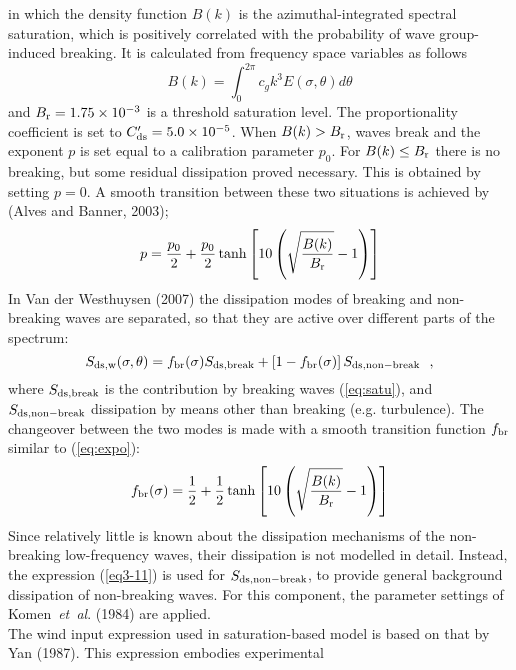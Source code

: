 \documentclass[12pt]{book}
\begin{document}
in which the density function $B(k)$ is the azimuthal-integrated spectral saturation, which is positively correlated with
the probability of wave group-induced breaking. It is calculated from frequency space variables as follows
\begin{equation}
  B(k) = \int_{0}^{2\pi} c_g k^3 E(\sigma,\theta) d\theta
\end{equation}
and $B_{\rm r} = 1.75 \times 10^{-3}$ is a threshold saturation level. The proportionality coefficient is set to
$C'_{\rm ds} = 5.0 \times 10^{-5}$. When $B(k) > B_{\rm r}$, waves break and the exponent $p$ is set equal
to a calibration parameter $p_0$. For $B(k) \leq B_{\rm r}$ there is no breaking, but some residual dissipation proved
necessary. This is obtained by setting $p = 0$. A smooth transition between these two situations is achieved by
(Alves and Banner, 2003);
\begin{equation}
  p = \frac{p_0}{2} + \frac{p_0}{2} \tanh \left[ 10 \left( \sqrt{\frac{B(k)}{B_{\rm r}}} - 1 \right) \right]
  \label{eq:expo}
\end{equation}
\noindent
In Van der Westhuysen (2007) the dissipation modes of breaking and non-breaking waves are separated, so that they
are active over different parts of the spectrum:
\begin{equation}
  S_{\rm ds,w}(\sigma,\theta) = f_{\rm br}(\sigma)S_{\rm ds,break} + \left[ 1 - f_{\rm br}(\sigma) \right]
  S_{\rm ds,non-break} \ \ ,
  \label{eq:wctot}
\end{equation}
\noindent
where $S_{\rm ds,break}$ is the contribution by breaking waves (\ref{eq:satu}), and $S_{\rm ds,non-break}$ dissipation
by means other than breaking (e.g. turbulence). The changeover between the two modes is made with a smooth transition
function $f_{\rm br}$ similar to (\ref{eq:expo}):
\begin{equation}
  f_{\rm br}(\sigma) = \frac{1}{2} + \frac{1}{2} \tanh \left[ 10 \left( \sqrt{\frac{B(k)}{B_{\rm r}}} - 1 \right) \right]
  \label{eq:fbr}
\end{equation}
\noindent
Since relatively little is known about the dissipation mechanisms of the non-breaking low-frequency waves, their dissipation
is not modelled in detail. Instead, the expression (\ref{eq3-11}) is used for $S_{\rm ds,non-break}$, to provide general
background dissipation of non-breaking waves. For this component, the parameter settings of Komen~{\it et~al}. (1984)
are applied.
\\[2ex]
\noindent
The wind input expression used in saturation-based model is based on that by Yan (1987). This expression embodies experimental
\end{document}
